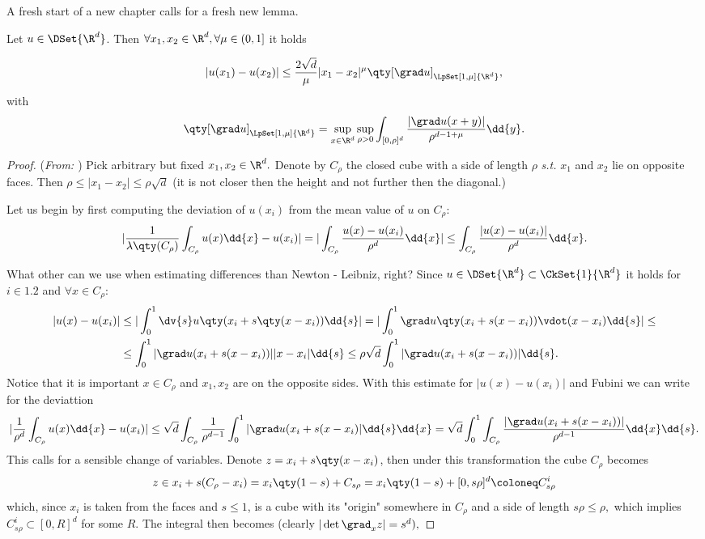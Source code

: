 A fresh start of a new chapter calls for a fresh new lemma.

\begin{lemma}[Morrey]
	Let $u \in \DSet{\R^{d}}$. Then $\forall x_1, x_2 \in \R^{d}, \forall \mu \in (0,1]$ it holds

	\[
		|u(x_1) - u(x_2)| \leq \frac{2 \sqrt{d}}{\mu}|x_1 - x_2|^{\mu} \qty[\grad u]_{\LpSet[1,\mu]{\R^{d}}},
	\]
	with
	\[
		\qty[\grad u]_{\LpSet[1,\mu]{\R^{d}}} = \sup_{x \in \R^{d}} \sup_{\rho >0} \int_{[0,\rho]^d}\frac{|\grad u(x+y)|}{\rho^{d-1+\mu}}\dd{y}.
	\]
\end{lemma}

\begin{proof}(\textit{From: \cite{bulicekUvodModerniTeorie2018}})
	Pick arbitrary but fixed $x_1, x_2 \in \R^{d}.$ Denote by $C_{\rho}$ the closed cube with a side of length $\rho$ \textit{s.t.} $x_1$ and $x_2$ lie on opposite faces. Then $\rho \leq |x_1 - x_2| \leq \rho \sqrt{d}$ (it is not closer then the height and not further then the diagonal.)

Let us begin by first computing the deviation of $u(x_i)$ from the mean value of $u$ on $C_{\rho}$:
	\[
		|\frac{1}{\lambda\qty(C_{\rho})} \int_{C_{\rho}}u(x)\dd{x} - u(x_i)| = |\int_{C_{\rho}}\frac{u(x)-u(x_i)}{\rho^d}\dd{x}| \leq \int_{C_{\rho}}\frac{|u(x)-u(x_i)|}{\rho^d}\dd{x}.
	\]

	What other can we use when estimating differences than Newton - Leibniz, right? Since $u \in \DSet{\R^{d}}\subset \CkSet{1}{\R^{d}}$ it holds for $i \in \qty{1,2}$ and $\forall x \in C_{\rho}:$
	\begin{align*}
		|u(x) - u(x_i)| &\leq |\int_0^1 \dv{s} u\qty(x_i + s\qty(x-x_i))\dd{s}| = |\int_0^1 \grad u\qty(x_i + s(x-x_i)) \vdot (x-x_i)\dd{s}|\leq \\
				&\leq \int_0^1 |\grad u(x_i + s(x-x_i))| |x-x_i| \dd{s} \leq \rho \sqrt{d} \int_0^1 |\grad u(x_i + s(x-x_i))| \dd{s}.
	\end{align*}
	Notice that it is important $x \in C_{\rho}$ and $x_1, x_2$ are on the opposite sides.	With this estimate for $|u(x) - u(x_i)|$ and Fubini we can write for the deviattion
	\[
		|\frac{1}{\rho^d}\int_{C_{\rho}}u(x)\dd{x} - u(x_i)| \leq \sqrt{d} \int_{C_{\rho}}\frac{1}{\rho^{d-1}}\int_0^1 |\grad u(x_i + s(x - x_i)|\dd{s}\dd{x} = \sqrt{d}\int_0^1 \int_{C_{\rho}}\frac{|\grad u(x_i + s(x-x_i))|}{\rho^{d-1}}\dd{x}\dd{s}.
	\]
	This calls for a sensible change of variables. Denote $z = x_i + s\qty(x-x_i)$, then under this transformation the cube $C_{\rho}$ becomes
	\[
		z \in x_i + s(C_{\rho}-x_i) = x_i\qty(1-s) + C_{s \rho} = x_i\qty(1-s) + [0, s \rho]^{d} \coloneq C^i_{s \rho}
	\]
	which, since $x_i$ is taken from the faces and $s \leq 1$, is a cube with its "origin" somewhere in $C_{\rho}$ and a side of length $s \rho \leq \rho,$ which implies $C_{s \rho}^i \subset [0,R]^d$ for some $R$. The integral then becomes (clearly $|\det \grad_x z| = s^d),$


\end{proof}
